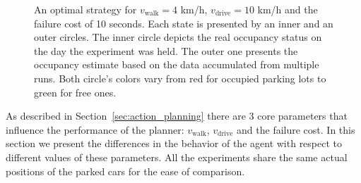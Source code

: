 \begin{figure}[tb]
\begin{center}
\hspace{2mm}
\hspace{2mm}
\end{center}
\caption{An optimal strategy for $v_{\mathrm{walk}} = 4$ km/h, $v_{\mathrm{drive}} = 10$ km/h and the failure cost of 10 seconds. Each state is presented by an inner and an outer circles. The inner circle depicts the real occupancy status on the day the experiment was held. The outer one presents the occupancy estimate based on the data accumulated from multiple runs. Both circle's colors vary from red for occupied parking lots to green for free ones.}
\label{fig:w_4_d_10_w_10_log_12_12}
\end{figure}

As described in Section~\ref{sec:action_planning} there are 3 core parameters
that influence the performance of the planner: $v_{\mathrm{walk}}$, $v_{\mathrm{drive}}$ and the
failure cost. In this section we present the differences in the behavior of
the agent with respect to different values of these parameters. All the
experiments share the same actual positions of the parked cars for the ease of
comparison.

